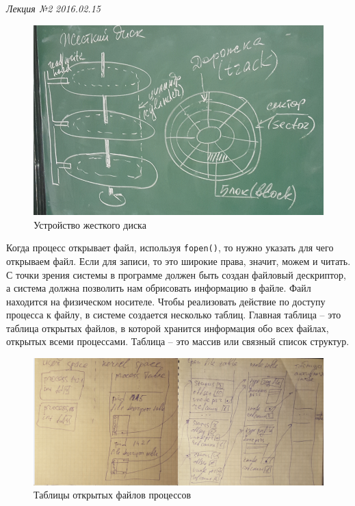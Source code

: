 \clearpage
\begin{flushright}
	\textit{Лекция №2}
	\textit{2016.02.15}
\end{flushright}

\begin{figure}[H]
  \centering
  \includegraphics[width=\textwidth]{pic/1.png}
  \caption{Устройство жесткого диска}
\end{figure}

Когда процесс открывает файл, используя \verb|fopen()|, то нужно указать для чего открываем файл. Если для записи, то это широкие права, значит, можем и читать.  С точки зрения системы в программе должен быть создан файловый дескриптор, а система должна позволить нам обрисовать информацию в файле. Файл находится на физическом носителе. Чтобы реализовать действие по доступу процесса к файлу, в системе создается несколько таблиц. Главная таблица – это таблица открытых файлов, в которой хранится информация обо всех файлах, открытых всеми процессами. Таблица – это массив или связный список структур.

\begin{figure}[H]
  \centering
  \includegraphics[width=\textwidth]{pic/2.png}
  \caption{Таблицы открытых файлов процессов}
\end{figure}


